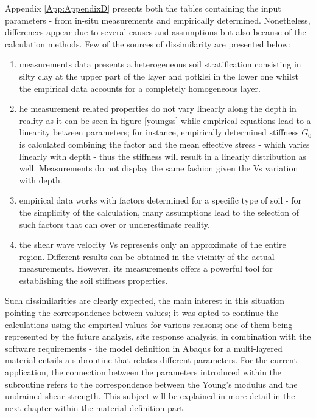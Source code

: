 \documentclass[11pt,a4paper]{report}
\begin{document}
Appendix \ref{App:AppendixD} presents both the tables containing the input parameters - from in-situ measurements and empirically determined. Nonetheless, differences appear due to several causes and assumptions but also because of the calculation methods. Few of the sources of dissimilarity are presented below:
\begin{enumerate}
	\item measurements data presents a heterogeneous soil stratification consisting in silty clay at the upper part of the layer and potklei in the lower one whilst the empirical data accounts for a completely homogeneous layer.
	\item he measurement related properties do not vary linearly along the depth in reality as it can be seen in figure \ref{youngss} while empirical equations lead to a linearity between parameters; for instance, empirically determined stiffness $G_0$ is calculated combining the factor and the mean effective stress - which varies linearly with depth - thus the stiffness will result in a linearly distribution as well. Measurements do not display the same fashion given the Vs variation with depth.
	\item empirical data works with factors determined for a specific type of soil - for the simplicity of the calculation, many assumptions lead to the selection of such factors that can over or underestimate reality.
	\item the shear wave velocity Vs represents only an approximate of the entire region. Different results can be obtained in the vicinity of the actual measurements. However, its measurements offers a powerful tool for establishing the soil stiffness properties. 
\end{enumerate}

Such dissimilarities are clearly expected, the main interest in this situation pointing the \mbox{correspondence} between values; it was opted to continue the calculations using the empirical values for various reasons; one of them being represented by the future analysis, site response analysis, in combination with the software requirements - the model definition in Abaqus for a multi-layered material entails a subroutine that relates different parameters. For the current application, the connection between the parameters introduced within the subroutine refers to the correspondence between the Young's modulus and the undrained shear strength. This subject will be explained in more detail in the next chapter within the material definition part. 
\end{document}
